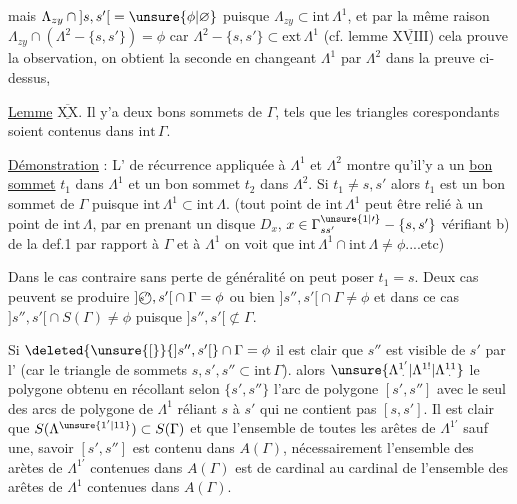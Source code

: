 mais $\Lambda_{zy}\cap{]s,s'[}=\unsure{\phi|\varnothing}$ puisque $\Lambda_{zy}\subset\mathrm{int}\,\Lambda^1$, et par la même raison $\Lambda_{zy}\cap(\Lambda^2-\{s,s'\})=\phi$ car $\Lambda^2-\{s,s'\}\subset\mathrm{ext}\,\Lambda^1$ (cf. lemme $\overline{\underline{\mathrm{XVIII}}}$) cela prouve la  observation, on obtient la seconde en changeant $\Lambda^1$ par $\Lambda^2$ dans la preuve ci-dessus, 

\uline{Lemme} $\overline{\underline{\mathrm{XX}}}$. Il y'a deux bons sommets de $\Gamma$,   tels que les  triangles corespondants soient contenus dans $\mathrm{int}\,\Gamma$.

\uline{Démonstration} : L' de récurrence appliquée à $\Lambda^1$ et $\Lambda^2$ montre qu'il'y a un \uline{bon sommet} %
$t_1$ dans $\Lambda^1$ et un bon sommet $t_2$ dans $\Lambda^2$. Si $t_1\ne s,s'$ alors $t_1$ est un bon sommet de $\Gamma$ puisque $\mathrm{int}\,\Lambda^1\subset\mathrm{int}\,\Lambda$. (tout point de $\mathrm{int}\,\Lambda^1$ peut être relié à un point de $\mathrm{int}\,\Lambda$, par  en prenant un disque $D_x$, $x\in\Gamma^{\unsure{1|\prime}}_{ss'}-\{s,s'\}$ vérifiant b) de la def.1 par rapport à $\Gamma$ et à $\Lambda^1$ on voit que $\mathrm{int}\,\Lambda^1\cap\mathrm{int}\,\Lambda\ne\phi$....etc)

Dans le cas contraire sans perte de généralité on peut poser $t_1=s$. Deux cas peuvent se produire $ {]\text{\textcircled{\scriptsize \(s''\)}},s'[}\cap\Gamma=\phi$ ou bien $ {]s'',s'[}\cap\Gamma\ne\phi$ et dans ce cas $ {]s'',s'[}\cap S(\Gamma)\ne\phi$ puisque $ {]s'',s'[}\not\subset\Gamma$.

Si $\deleted{\unsure{[}}{]s'',s'[}\cap\Gamma=\phi$ il est clair que $s''$ est visible de $s'$ par l' (car le triangle de sommets $s,s',s''\subset\mathrm{int}\,\Gamma$).  alors $\unsure{\Lambda^{1'}_{\mkern5mu\cdot}|\Lambda^{1!}|\Lambda^{11}_{\mkern5mu\cdot}}$ le polygone \margin{!}obtenu en récollant selon  $\{s',s''\}$ l'arc de polygone $[s',s'']$ avec le seul des arcs de polygone de $\Lambda^1$ réliant $s$ à $s'$ qui ne contient pas $[s,s']$. Il est clair que $S(\Lambda^{\unsure{1'|11}})\subset S(\Gamma)$ et que l'ensemble de toutes les arêtes de $\Lambda^{1'}$ sauf une, savoir $[s',s'']$ est contenu dans $A(\Gamma)$,  nécessairement l'ensemble des arètes de $\Lambda^{1'}$ contenues dans $A(\Gamma)$ est de cardinal   %
au cardinal de l'ensemble des arêtes de $\Lambda^1$ contenues dans $A(\Gamma)$.


